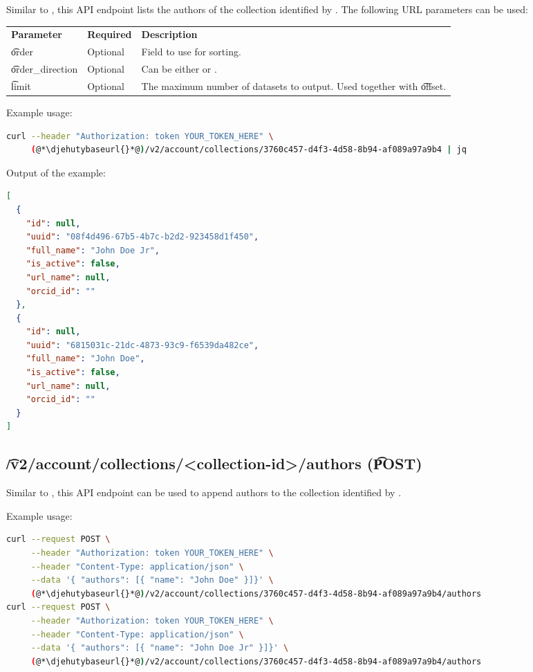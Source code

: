   Similar to , this API endpoint lists the
  authors of the collection identified by .
  The following URL parameters can be used:

\begin{tabularx}{\textwidth}{*{2}{!{\VRule[-1pt]}l}!{\VRule[-1pt]}X}
  \headrow
  \textbf{Parameter}   & \textbf{Required} & \textbf{Description}\\
  \t{order}            & Optional & Field to use for sorting.\\
  \t{order\_direction} & Optional & Can be either  or .\\
  \t{limit}            & Optional & The maximum number of datasets to output.
                                    Used together with \t{offset}.
\end{tabularx}

  Example usage:
\begin{lstlisting}[language=bash]
curl --header "Authorization: token YOUR_TOKEN_HERE" \
     (@*\djehutybaseurl{}*@)/v2/account/collections/3760c457-d4f3-4d58-8b94-af089a97a9b4 | jq
\end{lstlisting}

  Output of the example:
\begin{lstlisting}[language=JSON]
[
  {
    "id": null,
    "uuid": "08f4d496-67b5-4b7c-b2d2-923458d1f450",
    "full_name": "John Doe Jr",
    "is_active": false,
    "url_name": null,
    "orcid_id": ""
  },
  {
    "id": null,
    "uuid": "6815031c-21dc-4873-93c9-f6539da482ce",
    "full_name": "John Doe",
    "is_active": false,
    "url_name": null,
    "orcid_id": ""
  }
]
\end{lstlisting}

\subsection{\t{/v2/account/collections/<collection-id>/authors} (\t{POST})}
\label{sec:api-v2-collections-authors-post}

  Similar to , this API endpoint can
  be used to append authors to the collection identified by .

  \authorParameters

  Example usage:
\begin{lstlisting}[language=bash]
curl --request POST \
     --header "Authorization: token YOUR_TOKEN_HERE" \
     --header "Content-Type: application/json" \
     --data '{ "authors": [{ "name": "John Doe" }]}' \
     (@*\djehutybaseurl{}*@)/v2/account/collections/3760c457-d4f3-4d58-8b94-af089a97a9b4/authors
curl --request POST \
     --header "Authorization: token YOUR_TOKEN_HERE" \
     --header "Content-Type: application/json" \
     --data '{ "authors": [{ "name": "John Doe Jr" }]}' \
     (@*\djehutybaseurl{}*@)/v2/account/collections/3760c457-d4f3-4d58-8b94-af089a97a9b4/authors
\end{lstlisting}

